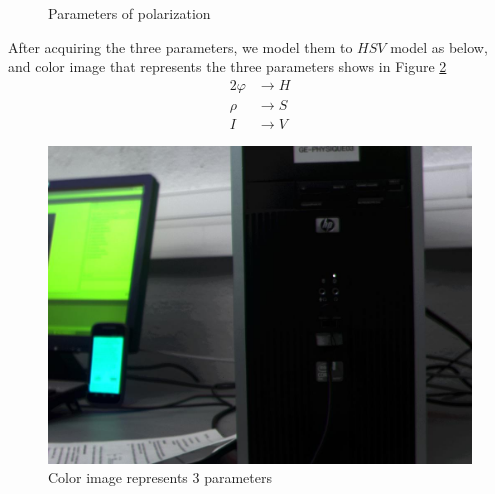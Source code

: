 \documentclass[english]{article}
\begin{document}
\begin{figure}[H]
	\centering
	\caption{Parameters of polarization}
	\label{fig:two}
\end{figure}

After acquiring the three parameters, we model them to $HSV$ model as below, and color image that represents the three parameters shows in Figure \ref{fig:hsv}\\
\begin{align*} 
	2\varphi & \rightarrow H\\
	\rho & \rightarrow S\\
	I & \rightarrow V
\end{align*}


 \begin{figure}[H]
 	\centering
	\includegraphics[width=\linewidth]{Pictures/Least_Mean/HSV2RGB.jpg}
 	\caption{Color image represents 3 parameters}
 	\label{fig:hsv}
 \end{figure}
\end{document}

